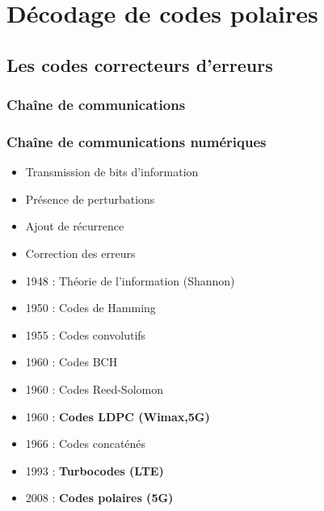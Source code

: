 

\section[Introduction]{Décodage de codes polaires}
\subsection*{Les codes correcteurs d'erreurs}

\begin{frame}[c]
	\begin{center}
	\end{center}
  	\frametitle<1>{Chaîne de communications}
  	\frametitle<2->{Chaîne de communications numériques}
	\begin{itemize}
		\item<1-> Transmission de bits d'information
		\item<2-> Présence de perturbations
		\item<7-> Ajout de récurrence
		\item<9-> Correction des erreurs
	\end{itemize}
\end{frame}

\begin{frame}
\vfill
	\begin{itemize}
		\item 1948 : Théorie de l’information (Shannon)
		\item 1950 : Codes de Hamming
		\item 1955 : Codes convolutifs
		\item 1960 : Codes BCH
		\item 1960 : Codes Reed-Solomon
		\item 1960 : \textbf{Codes LDPC (Wimax,5G)}
		\item 1966 : Codes concaténés
		\item 1993 : \textbf{Turbocodes (LTE)}
		\item 2008 : \textbf{Codes polaires (5G)}
	\end{itemize}
	\vfill
\end{frame}


